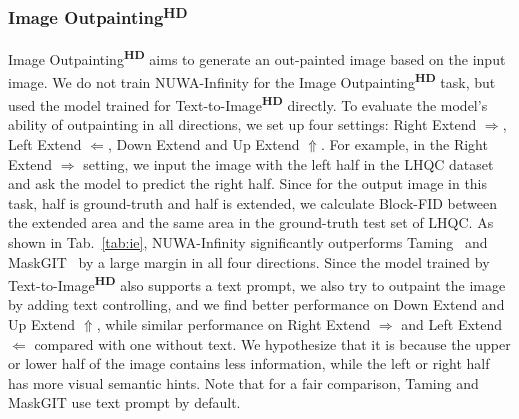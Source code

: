 \documentclass{article}
\begin{document}
\subsubsection{Image Outpainting\textsuperscript{\textbf{HD}}}
Image Outpainting\textsuperscript{\textbf{HD}} aims to generate an out-painted image based on the input image. We do not train NUWA-Infinity for the Image Outpainting\textsuperscript{\textbf{HD}} task, but used the model trained for Text-to-Image\textsuperscript{\textbf{HD}} directly. To evaluate the model's ability of outpainting in all directions, we set up four settings: Right Extend $\Rightarrow$, Left Extend $\Leftarrow $, Down Extend  and Up Extend $\Uparrow$. For example, in the Right Extend $\Rightarrow$ setting, we input the image with the left half in the LHQC dataset and ask the model to predict the right half. Since for the output image in this task, half is ground-truth and half is extended, we calculate Block-FID between the extended area and the same area in the ground-truth test set of LHQC. As shown in Tab.~\ref{tab:ie}, NUWA-Infinity significantly outperforms Taming~\cite{esserTamingTransformersHighResolution2021} and MaskGIT~\cite{changMaskGITMaskedGenerative2022} by a large margin in all four directions. Since the model trained by Text-to-Image\textsuperscript{\textbf{HD}} also supports a text prompt, we also try to outpaint the image by adding text controlling, and we find better performance on Down Extend  and Up Extend $\Uparrow$, while similar performance on Right Extend $\Rightarrow$ and Left Extend $\Leftarrow $ compared with one without text. We hypothesize that it is because the upper or lower half of the image contains less information, while the left or right half has more visual semantic hints. Note that for a fair comparison, Taming and MaskGIT use text prompt by default.
\end{document}
